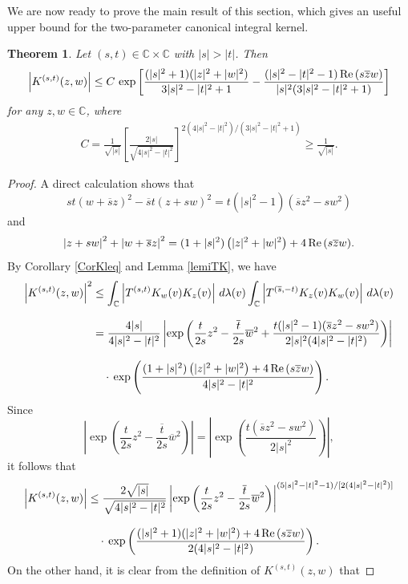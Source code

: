 \documentclass[reqno]{amsart}
\newtheorem{theorem}{Theorem}%
\newcommand{\C}{{\mathbb C}}
\newcommand{\inc}{\int_{\C}}
\DeclareMathOperator{\re}{{\rm Re}\,}
\begin{document}
We are now ready to prove the main result of this section, which gives
an useful upper bound for the two-parameter canonical integral kernel.

\begin{theorem}\label{thmKzw}
Let $(s, t)\in\C\times\C$ with $|s|>|t|$. Then
$$\left| K^{(s,t)}(z,w)\right|\leq C\,\exp\left[\frac{(|s|^2+1)
(|z|^2+|w|^2)}{3|s|^2-|t|^2+1}-\frac{(|s|^2-|t|^2-1)
\re({s\overline{z}w})}{|s|^2(3|s|^2-|t|^2+1)}\right]$$
for any $z, w\in\C$, where
\begin{align*}
C=\frac{1}{\sqrt{|s|}}\left[\frac{2{|s|}}{\sqrt{4|s|^2-|t|^2}}
\right]^{\displaystyle2(4|s|^2-|t|^2)/(3|s|^2-|t|^2+1)}
\geq\frac{1}{\sqrt{|s|}}.
\end{align*}
\end{theorem}

\begin{proof}
A direct calculation shows that
$$s{t}\left(w+\overline sz\right)^2-\overline st\left( z+sw\right)^2
=t(|s|^2-1)(\overline sz^{2}-sw^2)$$
and
$$\left|{z}+{s}{w}\right|^2+\left|{w}+\overline{s}{z}\right|^2=
(1+|s|^2)\left(|z|^2+|w|^2\right)+4\re ({s\overline{z}w}).$$
By Corollary \ref{CorKleq} and Lemma \ref{lemiTK}, we have
\begin{align*}
\left|K^{(s,t)}(z,w)\right|^2&\leq\inc\left|T^{(s,t)}K_w(v)K_z(v)\right|
\,d\lambda(v)\inc\left|{T^{(\overline{s},-t)}K_z(v)K_w(v)}\right|\,
d\lambda(v)\\[8pt]
&=\frac{4|s|}{{4|s|^2-|t|^2} }\left|\exp\left(\frac{{t}}{2{s}}{z}^2
-\frac{\overline{t}}{2s}\overline{w}^2+\frac{{t}(|s|^2-1)
(\overline{s}z^{2}-sw^2)}{2|s|^2(4|s|^2-|t|^2)}\right)\right|\\[8pt]
&\quad\cdot\,\exp\left(\frac{(1+|s|^2)\left(|z|^2+|w|^2\right)
+4\re ({s\overline{z}w})}{4|s|^2-|t|^2}\right).
\end{align*}
Since
$$\left|\exp\left(\frac{t}{2s}z^2-\frac{\overline{t}}{2s}\overline{w}^2
\right)\right|=\left|\exp\left(\frac{{t}(\overline{s}{z}^2-s{w}^2)}{2{|s|^2}}
\right)\right|,$$
it follows that
\begin{align}\label{eqTKzw}
\left| K^{(s,t)}(z,w)\right|&\leq\frac{2\sqrt{|s|}}{\sqrt{4|s|^2-|t|^2} }
\left|\exp\left(\frac{t}{2s}z^2-\frac{\overline{t}}{2s}\overline{w}^2\right)
\right|^{(5|s|^2-|t|^2-1)/[2(4|s|^2-|t|^2)]}\nonumber\\[8pt]
&\quad\cdot\,\exp\left(\frac{(|s|^2+1)(|z|^2+|w|^2)+4\re ({s\overline{z}w})}
{2(4|s|^2-|t|^2)}\right).
\end{align}
On the other hand, it is clear from the definition of $K^{(s,t)}(z,w)$ that

\end{proof}
\end{document}
